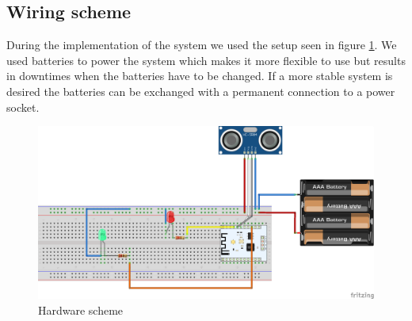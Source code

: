 \documentclass{article}
\begin{document}
\subsection{Wiring scheme}
During the implementation of the system we used the setup seen in figure \ref{schema_bb}. We used batteries to power the system which makes it more flexible to use but results in downtimes when the batteries have to be changed. If a more stable system is desired the batteries can be exchanged with a permanent  connection to a power socket.
\begin{figure}[]
	\centering \includegraphics[scale=0.4]{images/schema_bb.png}
	\caption{Hardware scheme}
	\label{schema_bb}
\end{figure}
\end{document}
